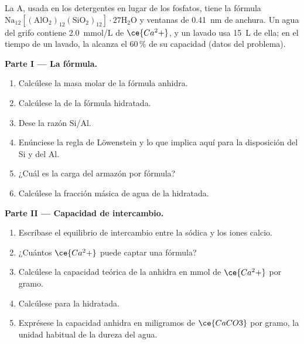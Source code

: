 \begin{problem}
\label{pb:b3:inorganic-materials:1}
La  A, usada en los detergentes en lugar de los fosfatos, tiene la fórmula
$\mathrm{Na_{12}[(AlO_2)_{12}(SiO_2)_{12}]\cdot 27H_2O}$ y ventanas de \qty{0.41}{nm} de anchura. Un agua del grifo contiene
\qty{2.0}{mmol/L} de $\ce{Ca^2+}$, y un lavado usa \qty{15}{L} de ella; en el tiempo de un lavado, la 
alcanza el 60\,\% de su capacidad (datos del problema).

\medskip\noindent\textbf{Parte I --- La fórmula.}
\begin{enumerate}
  \item Calcúlese la masa molar de la fórmula anhidra.
  \item Calcúlese la de la fórmula hidratada.
  \item Dese la razón Si/Al.
  \item Enúnciese la regla de Löwenstein y lo que implica aquí para la disposición del
        Si y del Al.
  \item ¿Cuál es la carga del armazón por fórmula?
  \item Calcúlese la fracción másica de agua de la  hidratada.
\end{enumerate}

\medskip\noindent\textbf{Parte II --- Capacidad de intercambio.}
\begin{enumerate}[resume]
  \item Escríbase el equilibrio de intercambio entre la  sódica y los iones
        calcio.
  \item ¿Cuántos $\ce{Ca^2+}$ puede captar una fórmula?
  \item Calcúlese la capacidad teórica de la  anhidra en mmol de $\ce{Ca^2+}$
        por gramo.
  \item Calcúlese para la  hidratada.
  \item Exprésese la capacidad anhidra en miligramos de $\ce{CaCO3}$ por gramo, la unidad
        habitual de la dureza del agua.
\end{enumerate}


\end{problem}
